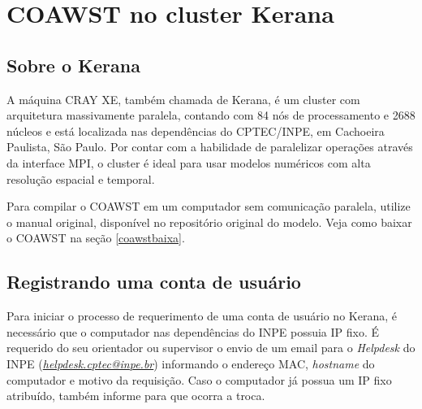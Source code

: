 
\chapter{COAWST no cluster Kerana}
\bigskip

\section{Sobre o Kerana}
\bigskip

\noindent A máquina CRAY XE, também chamada de Kerana, é um cluster com arquitetura massivamente paralela,
contando com 84 nós de processamento e 2688 núcleos e está localizada nas dependências do CPTEC/INPE,
em Cachoeira Paulista, São Paulo. Por contar com a habilidade de paralelizar operações através da interface
MPI, o cluster é ideal para usar modelos numéricos com alta resolução espacial
e temporal.
\bigskip


\begin{tcolorbox}[enhanced,
  grow to left by   = 0cm,
  grow to right by  = 0cm,
  enlarge top by    = 0cm,
  enlarge bottom by = 0cm,
  tcbox raise base,
  boxrule           = 1.0pt,
  left              = 18mm,
  colframe          = red!50!black,coltext=red!25!black,colback=red!10!white,
  overlay           = {\begin{tcbclipinterior}\fill[red!75!blue!50!white] (frame.south west)
    rectangle node[text=white,font=\sffamily\bfseries\footnotesize,rotate=0] {ATENÇÃO} ([xshift=18mm]frame.north west);\end{tcbclipinterior}}]
Para compilar o COAWST em um computador sem comunicação paralela, utilize o manual original, disponível no repositório original do modelo. Veja como baixar o COAWST na seção \textcolor{bleu_cite}{\ref{coawstbaixa}}.
\end{tcolorbox}
\bigskip

\section{Registrando uma conta de usuário}
\bigskip

\noindent Para iniciar o processo de requerimento de uma conta de usuário no Kerana, é necessário que o computador nas
          dependências do INPE possuia IP fixo. É requerido do seu orientador ou supervisor o envio de um email para o \textit{Helpdesk} 
          do INPE  (\textcolor{bleu_cite}{\href{helpdesk.cptec@inpe.br}{\textit{helpdesk.cptec@inpe.br}}}) informando o endereço MAC, 
          \textit{hostname} do computador e motivo da requisição. Caso o computador já possua um IP fixo atribuído, também
           informe para que ocorra a troca.
\bigskip

